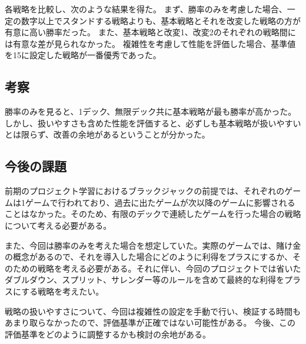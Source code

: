 各戦略を比較し、次のような結果を得た。
まず、勝率のみを考慮した場合、一定の数字以上でスタンドする戦略よりも、基本戦略とそれを改変した戦略の方が有意に高い勝率だった。
また、基本戦略と改変1、改変2のそれぞれの戦略間には有意な差が見られなかった。
複雑性を考慮して性能を評価した場合、基準値を15に設定した戦略が一番優秀であった。

\subsection{考察}

勝率のみを見ると、1デック、無限デック共に基本戦略が最も勝率が高かった。しかし、扱いやすさも含めた性能を評価すると、必ずしも基本戦略が扱いやすいとは限らず、改善の余地があるということが分かった。

\subsection{今後の課題}

前期のプロジェクト学習におけるブラックジャックの前提では、それぞれのゲームは1ゲームで行われており、過去に出たゲームが次以降のゲームに影響されることはなかった。そのため、有限のデックで連続したゲームを行った場合の戦略について考える必要がある。

また、今回は勝率のみを考えた場合を想定していた。実際のゲームでは、賭け金の概念があるので、それを導入した場合にどのように利得をプラスにするか、そのための戦略を考える必要がある。それに伴い、今回のプロジェクトでは省いたダブルダウン、スプリット、サレンダー等のルールを含めて最終的な利得をプラスにする戦略を考えたい。

戦略の扱いやすさについて、今回は複雑性の設定を手動で行い、検証する時間もあまり取らなかったので、評価基準が正確ではない可能性がある。
今後、この評価基準をどのように調整するかも検討の余地がある。

